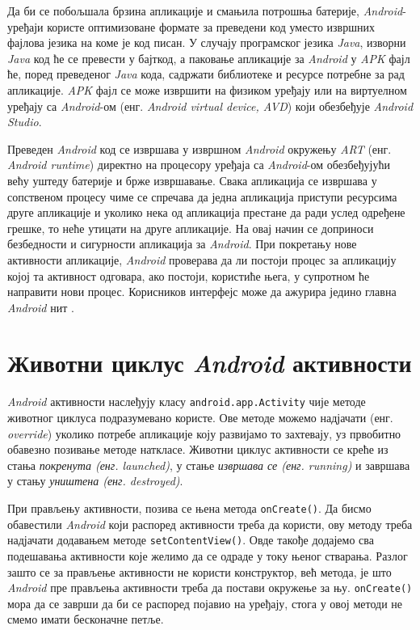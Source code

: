 \documentclass[12pt,oneside]{memoir}
\begin{document}
Да би се побољшала брзина апликације и смањила потрошња батерије, \textit{Android}-уређаји користе оптимизоване формате за преведени код уместо извршних фајлова језика на коме је код писан. У случају програмског језика \textit{Java}, изворни \textit{Java} код ће се превести у бајткод, а паковање апликације за \textit{Android} у \textit{APK} фајл ће, поред преведеног \textit{Java} кода, садржати библиотеке и ресурсе потребне за рад апликације. \textit{APK} фајл се може извршити на физиком уређају или на виртуелном уређају са \textit{Android}-ом (енг. \textit{Android virtual device, AVD}) који обезбеђује \textit{Android Studio}.

Преведен \textit{Android} код се извршава у извршном \textit{Android} окружењу \textit{ART} (енг. \textit{Android runtime}) директно на процесору уређаја са \textit{Android}-ом обезбеђујући већу уштеду батерије и брже извршавање. Свака апликација се извршава у сопственом процесу чиме се спречава да једна апликација приступи ресурсима друге апликације и уколико нека од апликација престане да ради услед одређене грешке, то неће утицати на друге апликације. На овај начин се доприноси безбедности и сигурности апликација за \textit{Android}. При покретању нове активности апликације, \textit{Android} проверава да ли постоји процес за апликацију којој та активност одговара, ако постоји, користиће њега, у супротном ће направити нови процес. Корисников интерфејс може да ажурира једино главна \textit{Android} нит \cite{AndroidBezOklevanja}.


\section{Животни циклус \textit{Android} активности}


\textit{Android} активности наслеђују класу \texttt{android.app.Activity} чије методе животног циклуса подразумевано користе. Ове методе можемо надјачати (енг. \textit{override}) уколико потребе апликације коју развијамо то захтевају, уз првобитно обавезно позивање методе наткласе. Животни циклус активности се креће из стања \textit{покренута (енг. launched)}, у стање \textit{извршава се (енг. running)} и завршава у стању \textit{уништена (енг. destroyed)}. 

При прављењу активности, позива се њена метода \texttt{onCreate()}. Да бисмо обавестили \textit{Android} који распоред активности треба да користи, ову методу треба надјачати додавањем методе \texttt{setContentView()}. Овде такође додајемо сва подешавања активности које желимо да се одраде у току њеног стварања. Разлог зашто се за прављење активности не користи конструктор, већ метода, је што \textit{Android} пре прављења активности треба да постави окружење за њу. \texttt{onCreate()} мора да се заврши да би се распоред појавио на уређају, стога у овој методи не смемо имати бесконачне петље.
\end{document}
